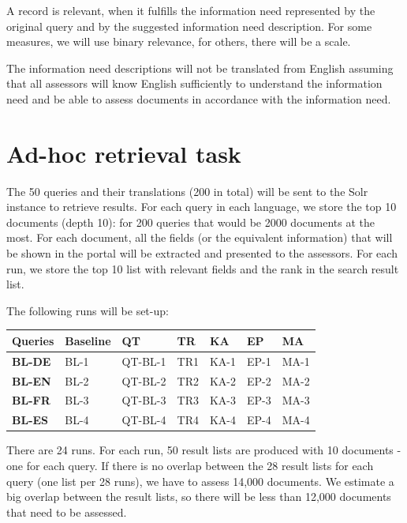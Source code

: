 \documentclass[a4paper,11pt]{article}
\begin{document}
A record is relevant, when it fulfills the information need represented by the original
query and by the suggested information need description. For some measures, we will use binary relevance, for others, there will be a scale.

The information need descriptions will not be translated from English assuming that all assessors will know English sufficiently to understand the information need and be able to assess documents in accordance with the information need.


\section{Ad-hoc retrieval task}

The 50 queries and their translations (200 in total) will be sent to the Solr instance to retrieve results. 
For each query in each language, we store the top 10 documents (depth 10): for 200 queries that would be 2000 documents at the most. For each document, all the fields (or the equivalent information) that will be shown in the portal will be extracted and presented to the assessors.
For each run, we store the top 10 list with relevant fields and the rank in the search result list.

The following runs will be set-up:
\newline

\begin{tabular}{|l|l|l|l|l|l|l|}

\hline
\textbf{Queries} & \textbf{Baseline} & \textbf{QT} & \textbf{TR} & \textbf{KA} & \textbf{EP} & \textbf{MA} \\ \hline
\textbf{BL-DE} & BL-1 & QT-BL-1 & TR1 & KA-1 & EP-1 & MA-1 \\ \hline
\textbf{BL-EN} & BL-2 & QT-BL-2 & TR2 & KA-2 & EP-2 & MA-2 \\ \hline
\textbf{BL-FR} & BL-3 & QT-BL-3 & TR3 & KA-3 & EP-3 & MA-3 \\ \hline
\textbf{BL-ES} & BL-4 & QT-BL-4 & TR4 & KA-4 & EP-4 & MA-4 \\ \hline
\end{tabular}
\newline

There are 24 runs. For each run, 50 result lists are produced with 10 documents - one for each query. If there is no overlap between the 28 result lists for each query (one list per 28 runs), we have to assess 14,000 documents. We estimate a big overlap between the result lists, so there will be less than 12,000 documents that need to be assessed.
\end{document}
